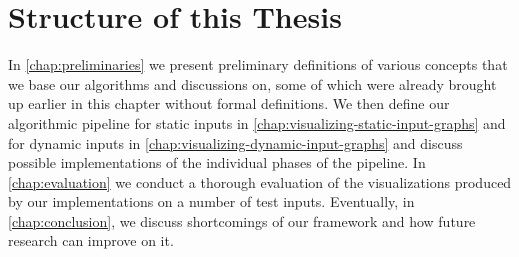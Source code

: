 \section{Structure of this Thesis}
\label{sect:structure-of-this-thesis}

In \cref{chap:preliminaries} we present preliminary definitions of various concepts that we base our algorithms and discussions on, some of which were already brought up earlier in this chapter without formal definitions.
We then define our algorithmic pipeline for static inputs in \cref{chap:visualizing-static-input-graphs} and for dynamic inputs in \cref{chap:visualizing-dynamic-input-graphs} and discuss possible implementations of the individual phases of the pipeline.
In \cref{chap:evaluation} we conduct a thorough evaluation of the visualizations produced by our implementations on a number of test inputs.
Eventually, in \cref{chap:conclusion}, we discuss shortcomings of our framework and how future research can improve on it.
